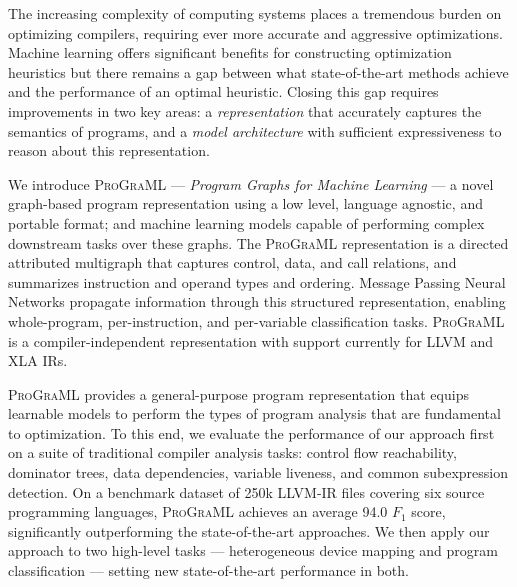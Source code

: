The increasing complexity of computing systems places a tremendous
burden on optimizing compilers, requiring ever more accurate and
aggressive optimizations. Machine learning offers significant benefits
for constructing optimization heuristics but there remains a gap
between what state-of-the-art methods achieve and the performance of
an optimal heuristic. Closing this gap requires improvements in two
key areas: a \emph{representation} that accurately captures the
semantics of programs, and a \emph{model architecture} with sufficient
expressiveness to reason about this representation.

We introduce \textsc{ProGraML} --- \emph{Program Graphs for Machine
Learning} --- a novel graph-based program representation using a low
level, language agnostic, and portable format; and machine learning
models capable of performing complex downstream tasks over these
graphs. The \textsc{ProGraML} representation is a directed attributed
multigraph that captures control, data, and call relations, and
summarizes instruction and operand types and ordering. Message Passing
Neural Networks propagate information through this structured
representation, enabling whole-program, per-instruction, and
per-variable classification tasks. \textsc{ProGraML} is a
compiler-independent representation with support currently for LLVM
and XLA IRs.

\textsc{ProGraML} provides a general-purpose program representation
that equips learnable models to perform the types of program analysis
that are fundamental to optimization. To this end, we evaluate the
performance of our approach first on a suite of traditional compiler
analysis tasks: control flow reachability, dominator trees, data
dependencies, variable liveness, and common subexpression
detection. On a benchmark dataset of 250k LLVM-IR files covering six
source programming languages, \textsc{ProGraML} achieves an average
94.0 $F_1$ score, significantly outperforming the state-of-the-art
approaches. We then apply our approach to two high-level tasks ---
heterogeneous device mapping and program classification --- setting
new state-of-the-art performance in both.
